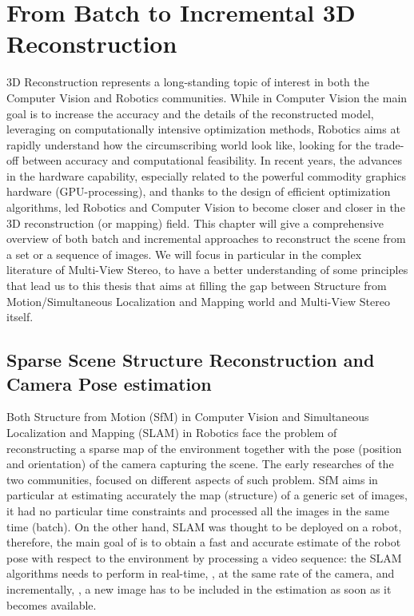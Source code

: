 \chapter{From Batch to Incremental 3D Reconstruction}

3D Reconstruction represents a long-standing topic of interest in both the Computer Vision and Robotics communities. 
While in Computer Vision the main goal is to increase the accuracy and the details of the reconstructed model, leveraging on computationally intensive optimization methods, Robotics aims at rapidly understand how the circumscribing world look like, looking for the trade-off between accuracy and computational feasibility.
In recent years, the advances in the hardware capability, especially related to the powerful commodity graphics hardware (GPU-processing), and thanks to the design of efficient optimization algorithms, led Robotics and Computer Vision to become closer and closer in the 3D reconstruction (or mapping) field.
This chapter will give a comprehensive overview of both batch and incremental approaches to reconstruct the scene from a set or a sequence of images. We will focus in particular in the complex literature of Multi-View Stereo, to have a better understanding of some principles that lead us to this thesis that aims at filling the gap between Structure from Motion/Simultaneous Localization and Mapping world and Multi-View Stereo itself. 





\section{Sparse Scene Structure Reconstruction and Camera Pose estimation}
\label{sec:slam}
Both Structure from Motion (SfM) in Computer Vision and Simultaneous Localization and Mapping (SLAM) in Robotics face the problem of reconstructing a sparse map of the environment together with the pose (position and orientation) of the camera capturing the scene.
The early researches of the two communities, focused on different aspects of such problem.
SfM aims in particular at  estimating accurately the map (structure) of a generic set of images, it had no particular time constraints and processed all the images in the same time (batch).
On the other hand, SLAM was thought to be deployed on a robot, therefore, the main goal of is to obtain a fast and accurate estimate of the robot pose with respect to the environment by processing a video sequence: the SLAM algorithms needs to perform in real-time, \ie, at the same rate of the camera, and incrementally, \ie, a new image  has to be included in the estimation as soon as it becomes available.


